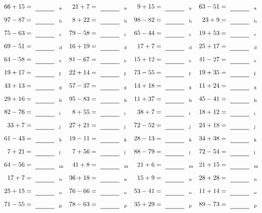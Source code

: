 \documentclass
[
  draft    = true,
  fontsize = 11pt,
  parskip  = half-
]
{scrartcl}
\begin{document}
\clearpage
\begin{align*}
    \pline{66+15}&=\rline{a}
  & \pline{21+7}&=\rline{a}
  & \pline{9+15}&=\rline{a}
  & \pline{63-51}&=\rline{a} \\[1ex]
    \pline{97-87}&=\rline{b}
  & \pline{8+22}&=\rline{b}
  & \pline{98-82}&=\rline{b}
  & \pline{23+9}&=\rline{b} \\[1ex]
    \pline{75-63}&=\rline{c}
  & \pline{79-58}&=\rline{c}
  & \pline{65-44}&=\rline{c}
  & \pline{19+53}&=\rline{c} \\[1ex]
    \pline{69-51}&=\rline{d}
  & \pline{16+19}&=\rline{d}
  & \pline{17+7}&=\rline{d}
  & \pline{25+17}&=\rline{d} \\[1ex]
    \pline{64-58}&=\rline{e}
  & \pline{81-67}&=\rline{e}
  & \pline{15+12}&=\rline{e}
  & \pline{41-27}&=\rline{e} \\[1ex]
    \pline{19+17}&=\rline{f}
  & \pline{22+14}&=\rline{f}
  & \pline{73-55}&=\rline{f}
  & \pline{19+35}&=\rline{f} \\[1ex]
    \pline{43+13}&=\rline{g}
  & \pline{57-37}&=\rline{g}
  & \pline{14+18}&=\rline{g}
  & \pline{11+24}&=\rline{g} \\[1ex]
    \pline{29+16}&=\rline{h}
  & \pline{95-83}&=\rline{h}
  & \pline{11+37}&=\rline{h}
  & \pline{45-41}&=\rline{h} \\[1ex]
    \pline{82-76}&=\rline{i}
  & \pline{8+55}&=\rline{i}
  & \pline{38+7}&=\rline{i}
  & \pline{18+12}&=\rline{i} \\[1ex]
    \pline{33+7}&=\rline{j}
  & \pline{27+21}&=\rline{j}
  & \pline{72-52}&=\rline{j}
  & \pline{24+18}&=\rline{j} \\[1ex]
    \pline{61-43}&=\rline{k}
  & \pline{19-11}&=\rline{k}
  & \pline{28-13}&=\rline{k}
  & \pline{34+38}&=\rline{k} \\[1ex]
    \pline{7+21}&=\rline{l}
  & \pline{7+56}&=\rline{l}
  & \pline{88-79}&=\rline{l}
  & \pline{72-54}&=\rline{l} \\[1ex]
    \pline{64-56}&=\rline{m}
  & \pline{41+8}&=\rline{m}
  & \pline{21+6}&=\rline{m}
  & \pline{21+15}&=\rline{m} \\[1ex]
    \pline{17+7}&=\rline{n}
  & \pline{36+18}&=\rline{n}
  & \pline{15+9}&=\rline{n}
  & \pline{28+28}&=\rline{n} \\[1ex]
    \pline{25+15}&=\rline{o}
  & \pline{76-66}&=\rline{o}
  & \pline{53-41}&=\rline{o}
  & \pline{11+14}&=\rline{o} \\[1ex]
    \pline{71-55}&=\rline{p}
  & \pline{78-63}&=\rline{p}
  & \pline{35+29}&=\rline{p}
  & \pline{89-73}&=\rline{p}
\end{align*}
\end{document}

